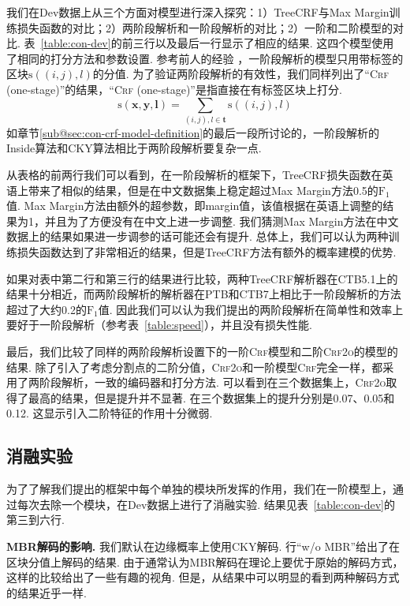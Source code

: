 我们在Dev数据上从三个方面对模型进行深入探究：1）TreeCRF与Max Margin训练损失函数的对比；2）两阶段解析和一阶段解析的对比；2）一阶和二阶模型的对比.
表~\ref{table:con-dev}的前三行以及最后一行显示了相应的结果.
这四个模型使用了相同的打分方法和参数设置.
参考前人的经验 \citep{stern-etal-2017-minimal}，一阶段解析的模型只用带标签的区块$\mathrm{s}((i,j),l)$的分值.
为了验证两阶段解析的有效性，我们同样列出了``\textsc{Crf} (one-stage)''的结果，``\textsc{Crf} (one-stage)''是指直接在有标签区块上打分.
\begin{equation} \label{eq:tree-label-score}
	\mathrm{s}(\boldsymbol{x},\boldsymbol{y},\boldsymbol{l}) =
	\sum_{(i,j),l \in \boldsymbol{t}} \mathrm{s}((i,j),l)
\end{equation}
如章节\ref{sub@sec:con-crf-model-definition}的最后一段所讨论的，一阶段解析的Inside算法和CKY算法相比于两阶段解析要复杂一点.

从表格的前两行我们可以看到，在一阶段解析的框架下，TreeCRF损失函数在英语上带来了相似的结果，但是在中文数据集上稳定超过Max Margin方法0.5的$\mathrm{F}_1$值.
Max Margin方法由额外的超参数，即margin值，该值根据在英语上调整的结果为1，并且为了方便没有在中文上进一步调整.
我们猜测Max Margin方法在中文数据上的结果如果进一步调参的话可能还会有提升.
总体上，我们可以认为两种训练损失函数达到了非常相近的结果，但是TreeCRF方法有额外的概率建模的优势.

如果对表中第二行和第三行的结果进行比较，两种TreeCRF解析器在CTB5.1上的结果十分相近，而两阶段解析的解析器在PTB和CTB7上相比于一阶段解析的方法超过了大约0.2的$\mathrm{F}_1$值.
因此我们可以认为我们提出的两阶段解析在简单性和效率上要好于一阶段解析（参考表~\ref{table:speed}），并且没有损失性能.

最后，我们比较了同样的两阶段解析设置下的一阶\textsc{Crf}模型和二阶\textsc{Crf2o}的模型的结果.
除了引入了考虑分割点的二阶分值，\textsc{Crf2o}和一阶模型\textsc{Crf}完全一样，都采用了两阶段解析，一致的编码器和打分方法.
可以看到在三个数据集上，\textsc{Crf2o}取得了最高的结果，但是提升并不显著.
在三个数据集上的提升分别是0.07、0.05和0.12.
这显示引入二阶特征的作用十分微弱.

\subsection{消融实验}

为了了解我们提出的框架中每个单独的模块所发挥的作用，我们在一阶模型上，通过每次去除一个模块，在Dev数据上进行了消融实验.
结果见表~\ref{table:con-dev}的第三到六行.

\noindent\textbf{MBR解码的影响.}
我们默认在边缘概率上使用CKY解码.
行``w/o MBR''给出了在区块分值上解码的结果.
由于通常认为MBR解码在理论上要优于原始的解码方式，这样的比较给出了一些有趣的视角.
但是，从结果中可以明显的看到两种解码方式的结果近乎一样.

